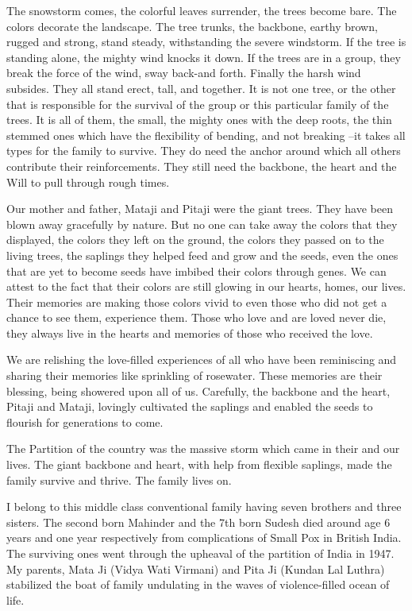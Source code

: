 The snowstorm comes, the colorful leaves surrender, the trees become bare. The colors decorate the landscape. The tree trunks, the backbone, earthy brown, rugged and strong, stand steady, withstanding the severe windstorm. If the tree is standing alone, the mighty wind knocks it down. If the trees are in a group, they break the force of the wind, sway back-and forth. Finally the harsh wind subsides. They all stand erect, tall, and together. It is not one tree, or the other that is responsible for the survival of the group or this particular family of the trees. It is all of them, the small, the mighty ones with the deep roots, the thin stemmed ones which have the flexibility of bending, and not breaking –it takes all types for the family to survive. They do need the anchor around which all others contribute their reinforcements. They still need the backbone, the heart and the Will to pull through rough times.

Our mother and father, Mataji and Pitaji were the giant trees. They have been blown away gracefully by nature. But no one can take away the colors that they displayed, the colors they left on the ground, the colors they passed on to the living trees, the saplings they helped feed and grow and the seeds, even the ones that are yet to become seeds have imbibed their colors through genes. We can attest to the fact that their colors are still glowing in our hearts, homes, our lives. Their memories are making those colors vivid to even those who did not get a chance to see them, experience them. Those who love and are loved never die, they always live in the hearts and memories of those who received the love. 

We are relishing the love-filled experiences of all who have been reminiscing and sharing their memories like sprinkling of rosewater. These memories are their blessing, being showered upon all of us. Carefully, the backbone and the heart, Pitaji and Mataji, lovingly cultivated the saplings and enabled the seeds to flourish for generations to come. 

The Partition of the country was the massive storm which came in their and our lives. The giant backbone and heart, with help from flexible saplings, made the family survive and thrive. The family lives on. 

I belong to this middle class conventional family having seven brothers and three sisters. The second born Mahinder and the 7th born Sudesh died around age 6 years and one year respectively from complications of Small Pox in British India. The surviving ones went through the upheaval of the partition of India in 1947. My parents, Mata Ji (Vidya Wati Virmani) and Pita Ji (Kundan Lal Luthra) stabilized the boat of family undulating in the waves of violence-filled ocean of life. 

